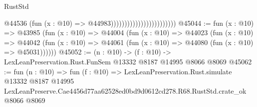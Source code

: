\begin{lexlean}{RustStd}
\begin{coremodule}
                                                @44536
                                                  (fun (x : @10) => @44983))))))))))))))))))))))))
@45044 := fun (x : @10) =>
  @43985
    (fun (x : @10) =>
    @44004
      (fun (x : @10) =>
      @44023
        (fun (x : @10) =>
        @44042 (fun (x : @10) => @44061 (fun (x : @10) => @44080 (fun (x : @10) => @45031))))))
@45052 := (n : @10) -> (f : @10) -> LexLeanPreservation.Rust.FunSem @13332 @8187 @14995 @8066 @8069
@45062 := fun (n : @10) =>
  fun (f : @10) =>
  LexLeanPreservation.Rust.simulate
    @13332
    @8187
    @14995
    LexLeanPreserve.Cae4456d77aa62528ed0bd9d0612cd278.R68.RustStd.crate_ok
    @8066
    @8069
\end{coremodule}
\end{lexlean}
